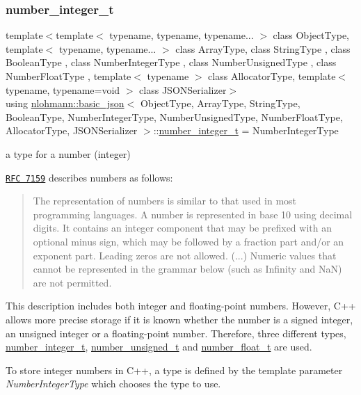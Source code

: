 \subsubsection{\texorpdfstring{number\+\_\+integer\+\_\+t}{number\_integer\_t}}
{\footnotesize\ttfamily template$<$template$<$ typename, typename, typename... $>$ class Object\+Type, template$<$ typename, typename... $>$ class Array\+Type, class String\+Type , class Boolean\+Type , class Number\+Integer\+Type , class Number\+Unsigned\+Type , class Number\+Float\+Type , template$<$ typename $>$ class Allocator\+Type, template$<$ typename, typename=void $>$ class J\+S\+O\+N\+Serializer$>$ \\
using \hyperlink{classnlohmann_1_1basic__json}{nlohmann\+::basic\+\_\+json}$<$ Object\+Type, Array\+Type, String\+Type, Boolean\+Type, Number\+Integer\+Type, Number\+Unsigned\+Type, Number\+Float\+Type, Allocator\+Type, J\+S\+O\+N\+Serializer $>$\+::\hyperlink{classnlohmann_1_1basic__json_a98e611d67b7bd75307de99c9358ab2dc}{number\+\_\+integer\+\_\+t} =  Number\+Integer\+Type}



a type for a number (integer) 

\href{http://rfc7159.net/rfc7159}{\tt R\+FC 7159} describes numbers as follows\+: \begin{quote}
The representation of numbers is similar to that used in most programming languages. A number is represented in base 10 using decimal digits. It contains an integer component that may be prefixed with an optional minus sign, which may be followed by a fraction part and/or an exponent part. Leading zeros are not allowed. (...) Numeric values that cannot be represented in the grammar below (such as Infinity and NaN) are not permitted. \end{quote}


This description includes both integer and floating-\/point numbers. However, C++ allows more precise storage if it is known whether the number is a signed integer, an unsigned integer or a floating-\/point number. Therefore, three different types, \hyperlink{classnlohmann_1_1basic__json_a98e611d67b7bd75307de99c9358ab2dc}{number\+\_\+integer\+\_\+t}, \hyperlink{classnlohmann_1_1basic__json_ab906e29b5d83ac162e823ada2156b989}{number\+\_\+unsigned\+\_\+t} and \hyperlink{classnlohmann_1_1basic__json_a88d6103cb3620410b35200ee8e313d97}{number\+\_\+float\+\_\+t} are used.

To store integer numbers in C++, a type is defined by the template parameter {\itshape Number\+Integer\+Type} which chooses the type to use.

